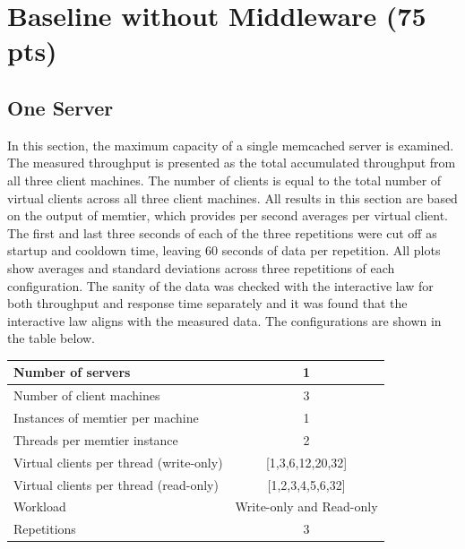 \documentclass[11pt,a4paper]{article}
\begin{document}
\section{Baseline without Middleware (75 pts)}

\subsection{One Server}

In this section, the maximum capacity of a single memcached server is examined. The measured throughput is presented as the total accumulated throughput from all three client machines. The number of clients is equal to the total number of virtual clients across all three client machines. All results in this section are based on the output of memtier, which provides per second averages per virtual client. The first and last three seconds of each of the three repetitions were cut off as startup and cooldown time, leaving 60 seconds of data per repetition. All plots show averages and standard deviations across three repetitions of each configuration. The sanity of the data was checked with the interactive law for both throughput and response time separately and it was found that the interactive law aligns with the measured data. The configurations are shown in the table below.

\begin{center}
	\scriptsize{
		\begin{tabular}{|l|c|}
			\hline Number of servers                        & 1                                 \\ 
			\hline Number of client machines                & 3                                 \\ 
			\hline Instances of memtier per machine         & 1                                 \\ 
			\hline Threads per memtier instance             & 2                                 \\
			\hline Virtual clients per thread (write-only)  & [1,3,6,12,20,32]                  \\ 
			\hline Virtual clients per thread (read-only)   & [1,2,3,4,5,6,32]                  \\ 
			\hline Workload                                 & Write-only and Read-only          \\
			\hline Repetitions                              & 3                                 \\ 
			\hline 
		\end{tabular}
	} 
\end{center}
\end{document}
